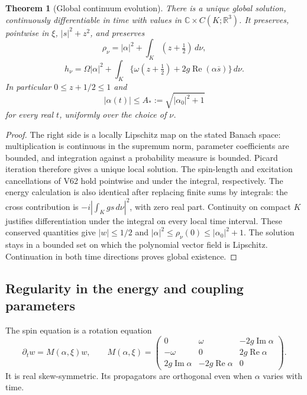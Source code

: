 \documentclass[11pt]{article}
\newtheorem{theorem}{Theorem}[section]
\theoremstyle{remark}
\begin{document}
\begin{theorem}[Global continuum evolution]
\label{thm:v20v63-global}
There is a unique global solution, continuously differentiable
in time with values in \(\mathbb C\times C(K;\mathbb R^3)\).
It preserves, pointwise in \(\xi\), \(|s|^2+z^2\), and preserves
\[
 \rho_\nu=|\alpha|^2+\int_K(z+\tfrac12)\,d\nu,
\]
\[
 h_\nu=\Omega|\alpha|^2+
          \int_K\{\omega(z+\tfrac12)
                         +2g\operatorname{Re}(\alpha\overline s)\}\,d\nu .
\]
In particular \(0\leq z+1/2\leq1\) and
\[
 |\alpha(t)|\leq A_*:=\sqrt{|\alpha_0|^2+1}
\]
for every real \(t\), uniformly over the choice of \(\nu\).
\end{theorem}
\begin{proof}
The right side is a locally Lipschitz map on the stated
Banach space: multiplication is continuous in the supremum
norm, parameter coefficients are bounded, and integration
against a probability measure is bounded.  Picard iteration
therefore gives a unique local solution.  The spin-length
and excitation cancellations of V62 hold pointwise and
under the integral, respectively.  The energy calculation
is also identical after replacing finite sums by integrals:
the cross contribution is
\(-i|\int_K g s\,d\nu|^2\), with zero real part.
Continuity on compact \(K\) justifies differentiation
under the integral on every local time interval.
These conserved quantities give
\(|w|\leq1/2\) and \(|\alpha|^2\leq\rho_\nu(0)
\leq|\alpha_0|^2+1\).  The solution stays in a bounded
set on which the polynomial vector field is Lipschitz.
Continuation in both time directions proves global existence.
\end{proof}

\subsection{Regularity in the energy and coupling parameters}

The spin equation is a rotation equation
\[
 \partial_t w=M(\alpha,\xi)w,\qquad
 M(\alpha,\xi)=
 \begin{pmatrix}
 0&\omega&-2g\operatorname{Im}\alpha\\
 -\omega&0&2g\operatorname{Re}\alpha\\
 2g\operatorname{Im}\alpha&-2g\operatorname{Re}\alpha&0
 \end{pmatrix}.
\]
It is real skew-symmetric.  Its propagators are orthogonal
even when \(\alpha\) varies with time.
\end{document}
